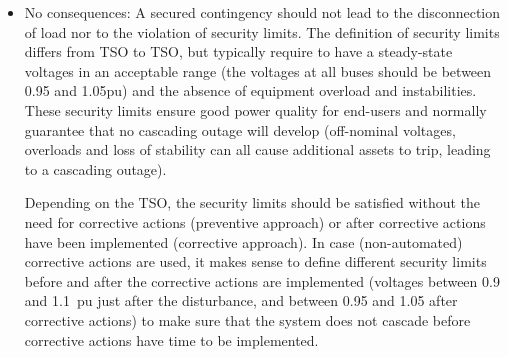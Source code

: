 \begin{itemize}
    \item No consequences: A secured contingency should not lead to the disconnection of load nor to the violation of security limits. The definition of security limits differs from TSO to TSO, but typically require to have a steady-state voltages in an acceptable range (\eg the voltages at all buses should be between 0.95 and 1.05pu) and the absence of equipment overload and instabilities. These security limits ensure good power quality for end-users and normally guarantee that no cascading outage will develop (off-nominal voltages, overloads and loss of stability can all cause additional assets to trip, leading to a cascading outage).

    Depending on the TSO, the security limits should be satisfied without the need for corrective actions (preventive approach) or after corrective actions have been implemented (corrective approach). In case (non-automated) corrective actions are used, it makes sense to define different security limits before and after the corrective actions are implemented (\eg voltages between 0.9 and 1.1~pu just after the disturbance, and between 0.95 and 1.05 after corrective actions) to make sure that the system does not cascade before corrective actions have time to be implemented.


\end{itemize}
